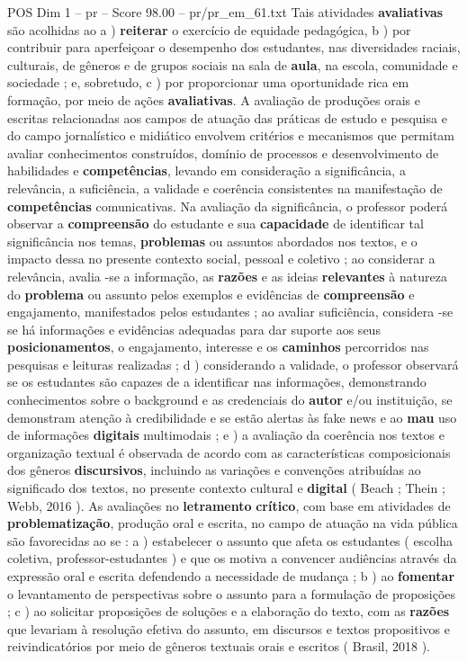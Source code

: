 \begin{textsample}{POS Dim 1 – pr – Score 98.00 – pr/pr\_em\_61.txt}
Tais atividades \textbf{avaliativas} são acolhidas ao a ) \textbf{reiterar} o exercício de equidade pedagógica, b ) por contribuir para aperfeiçoar o desempenho dos estudantes, nas diversidades raciais, culturais, de gêneros e de grupos sociais na sala de \textbf{aula}, na escola, comunidade e sociedade ; e, sobretudo, c ) por proporcionar uma oportunidade rica em formação, por meio de ações \textbf{avaliativas}.
A avaliação de produções orais e escritas relacionadas aos campos de atuação das práticas de estudo e pesquisa e do campo jornalístico e midiático envolvem critérios e mecanismos que permitam avaliar conhecimentos construídos, domínio de processos e desenvolvimento de habilidades e \textbf{competências}, levando em consideração a significância, a relevância, a suficiência, a validade e coerência consistentes na manifestação de \textbf{competências} comunicativas.
Na avaliação da significância, o professor poderá observar a \textbf{compreensão} do estudante e sua \textbf{capacidade} de identificar tal significância nos temas, \textbf{problemas} ou assuntos abordados nos textos, e o impacto dessa no presente contexto social, pessoal e coletivo ; ao considerar a relevância, avalia -se a informação, as \textbf{razões} e as ideias \textbf{relevantes} à natureza do \textbf{problema} ou assunto pelos exemplos e evidências de \textbf{compreensão} e engajamento, manifestados pelos estudantes ; ao avaliar suficiência, considera -se se há informações e evidências adequadas para dar suporte aos seus \textbf{posicionamentos}, o engajamento, interesse e os \textbf{caminhos} percorridos nas pesquisas e leituras realizadas ; d ) considerando a validade, o professor observará se os estudantes são capazes de a identificar nas informações, demonstrando conhecimentos sobre o background e as credenciais do \textbf{autor} e/ou instituição, se demonstram atenção à credibilidade e se estão alertas às fake news e ao \textbf{mau} uso de informações \textbf{digitais} multimodais ; e ) a avaliação da coerência nos textos e organização textual é observada de acordo com as características composicionais dos gêneros \textbf{discursivos}, incluindo as variações e convenções atribuídas ao significado dos textos, no presente contexto cultural e \textbf{digital} ( Beach ; Thein ; Webb, 2016 ).
As avaliações no \textbf{letramento} \textbf{crítico}, com base em atividades de \textbf{problematização}, produção oral e escrita, no campo de atuação na vida pública são favorecidas ao se : a ) estabelecer o assunto que afeta os estudantes ( escolha coletiva, professor-estudantes ) e que os motiva a convencer audiências através da expressão oral e escrita defendendo a necessidade de mudança ; b ) ao \textbf{fomentar} o levantamento de perspectivas sobre o assunto para a formulação de proposições ; c ) ao solicitar proposições de soluções e a elaboração do texto, com as \textbf{razões} que levariam à resolução efetiva do assunto, em discursos e textos propositivos e reivindicatórios por meio de gêneros textuais orais e escritos ( Brasil, 2018 ).

\end{textsample}
